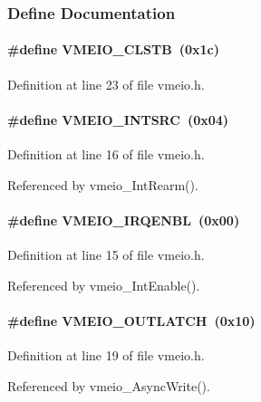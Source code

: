 

\subsubsection{Define Documentation}
\paragraph[{VMEIO\_\-CLSTB}]{\setlength{\rightskip}{0pt plus 5cm}\#define VMEIO\_\-CLSTB~(0x1c)}\hfill\label{vmeio_8h_af3409879302eac6c57e7088ee14a8609}


Definition at line 23 of file vmeio.h.
\paragraph[{VMEIO\_\-INTSRC}]{\setlength{\rightskip}{0pt plus 5cm}\#define VMEIO\_\-INTSRC~(0x04)}\hfill\label{vmeio_8h_a2ba7b7cf429fa89d756ed76318597b44}


Definition at line 16 of file vmeio.h.

Referenced by vmeio\_\-IntRearm().
\paragraph[{VMEIO\_\-IRQENBL}]{\setlength{\rightskip}{0pt plus 5cm}\#define VMEIO\_\-IRQENBL~(0x00)}\hfill\label{vmeio_8h_ac3d5e62e8c1392a0782cbf1dba05f788}


Definition at line 15 of file vmeio.h.

Referenced by vmeio\_\-IntEnable().
\paragraph[{VMEIO\_\-OUTLATCH}]{\setlength{\rightskip}{0pt plus 5cm}\#define VMEIO\_\-OUTLATCH~(0x10)}\hfill\label{vmeio_8h_af400c85bda3142c3e6a5243d8c993998}


Definition at line 19 of file vmeio.h.

Referenced by vmeio\_\-AsyncWrite().
